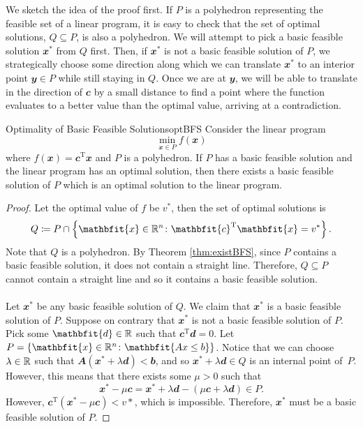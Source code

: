 \documentclass[math, code]{amznotes}
\theoremstyle{remark}
\begin{document}
We sketch the idea of the proof first. If $P$ is a polyhedron representing the feasible set of a linear program, it is easy to check that the set of optimal solutions, $Q \subseteq P$, is also a polyhedron. We will attempt to pick a basic feasible solution $\mathbfit{x}^*$ from $Q$ first. Then, if $\mathbfit{x}^*$ is not a basic feasible solution of $P$, we strategically choose some direction along which we can translate $\mathbfit{x}^*$ to an interior point $\mathbfit{y} \in P$ while still staying in $Q$. Once we are at $\mathbfit{y}$, we will be able to translate in the direction of $\mathbfit{c}$ by a small distance to find a point where the function evaluates to a better value than the optimal value, arriving at a contradiction.
\begin{thmbox}{Optimality of Basic Feasible Solutions}{optBFS}
    Consider the linear program 
    \begin{equation*}
        \min_{\mathbfit{x} \in P} f(\mathbfit{x})
    \end{equation*}
    where $f(\mathbfit{x}) = \mathbfit{c}^{\mathrm{T}}\mathbfit{x}$ and $P$ is a polyhedron. If $P$ has a basic feasible solution and the linear program has an optimal solution, then there exists a basic feasible solution of $P$ which is an optimal solution to the linear program.
    \tcblower
    \begin{proof}
        Let the optimal value of $f$ be $v^*$, then the set of optimal solutions is
        \begin{equation*}
            Q \coloneqq P \cap \left\{\mathbfit{x} \in \R^n \colon \mathbfit{c}^{\mathrm{T}}\mathbfit{x} = v^*\right\}.
        \end{equation*}
        Note that $Q$ is a polyhedron. By Theorem \ref{thm:existBFS}, since $P$ contains a basic feasible solution, it does not contain a straight line. Therefore, $Q \subseteq P$ cannot contain a straight line and so it contains a basic feasible solution.
        \\\\
        Let $\mathbfit{x}^*$ be any basic feasible solution of $Q$. We claim that $\mathbfit{x}^*$ is a basic feasible solution of $P$. Suppose on contrary that $\mathbfit{x}^*$ is not a basic feasible solution of $P$. Pick some $\mathbfit{d} \in \R$ such that $\mathbfit{c}^{\mathrm{T}}\mathbfit{d} = 0$. Let $P = \left\{\mathbfit{x} \in \R^n 
        \colon \mathbfit{Ax \leq b}\right\}$. Notice that we can choose $\lambda \in \mathbb{R}$ such that $\mathbfit{A}\left(\mathbfit{x}^* + \lambda\mathbfit{d}\right) < \mathbfit{b}$, and so $\mathbfit{x}^* + \lambda\mathbfit{d} \in Q$ is an internal point of~$P$. However, this means that there exists some $\mu > 0$ such that 
        \begin{equation*}
            \mathbfit{x}^* - \mu\mathbfit{c} = \mathbfit{x}^* + \lambda\mathbfit{d} - \left(\mu\mathbfit{c} + \lambda\mathbfit{d}\right) \in P.
        \end{equation*}
        However, $\mathbfit{c}^{\mathrm{T}}\left(\mathbfit{x}^* - \mu\mathbfit{c}\right) < v*$, which is impossible. Therefore, $\mathbfit{x}^*$ must be a basic feasible solution of $P$.
    \end{proof}
\end{thmbox}
\end{document}
